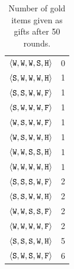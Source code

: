 \begin{table}
{{\begin{minipage}[b]{0.30\hsize}
\begin{tabular}{ l | c }
					$\personality{W}{W}{W}{S}{H}$ & 0\\
					$\personality{S}{W}{W}{W}{H}$ & 1\\
					$\personality{S}{S}{W}{W}{F}$ & 1\\
					$\personality{S}{W}{W}{W}{F}$ & 1\\
					$\personality{W}{S}{W}{W}{F}$ & 1\\
					$\personality{W}{S}{W}{W}{H}$ & 1\\
					$\personality{W}{W}{S}{S}{H}$ & 1\\
					$\personality{W}{W}{W}{W}{H}$ & 1\\
					$\personality{S}{S}{S}{W}{F}$ & 2\\
					$\personality{S}{S}{W}{W}{H}$ & 2\\
					$\personality{W}{W}{S}{S}{F}$ & 2\\
					$\personality{W}{W}{W}{W}{F}$ & 2\\
					$\personality{S}{S}{S}{W}{H}$ & 5\\
					$\personality{S}{W}{S}{W}{F}$ & 6\\
				\end{tabular}
				\caption{Number of gold items given as gifts after 50 rounds.}
				\label{tab:numGoldGiven}
			\end{minipage}
			\hfill
		}}
\end{table}
	
